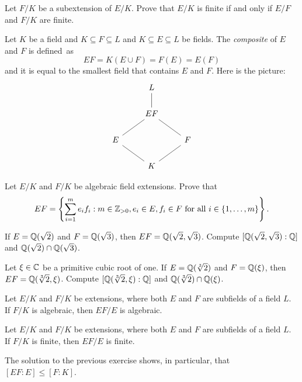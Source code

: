\begin{exercise}
\label{xca:tower of finite extensions}
	Let $F/K$ be a subextension of $E/K$. Prove that $E/K$ is finite 
	if and only if $E/F$ and $F/K$ are finite. 
\end{exercise}

Let $K$ be a field and $K\subseteq 
F\subseteq L$ and $K\subseteq E\subseteq L$ be fields. The \emph{composite}  
of $E$ and $F$ is defined~as 
\[
EF=K(E\cup F)=F(E)=E(F)
\]
and it is equal to the 
smallest field that contains $E$ and $F$. Here is the
picture:
\[\begin{tikzcd}
	& L \\
	& EF \\
	E && F \\
	& K
	\arrow[no head, from=1-2, to=2-2]
	\arrow[no head, from=2-2, to=3-1]
	\arrow[no head, from=2-2, to=3-3]
	\arrow[no head, from=3-1, to=4-2]
	\arrow[no head, from=4-2, to=3-3]
\end{tikzcd}\]


\begin{exercise}
\label{xca:composite generated by products}
    Let $E/K$ and $F/K$ be algebraic field extensions. 
    Prove that 
    \[
    EF=\left\{\sum_{i=1}^me_if_i:m\in\mathbb{Z}_{>0},e_i\in E,f_i\in F\text{ for all $i\in\{1,\dots,m\}$}\right\}.
    \]
\end{exercise}

\begin{exercise}
\label{xca:sqrt(2),sqrt(3)}
    If $E=\mathbb{Q}(\sqrt{2})$ and $F=\mathbb{Q}(\sqrt{3})$, then $EF=\mathbb{Q}(\sqrt{2},\sqrt{3})$. 
    Compute $[\mathbb{Q}(\sqrt{2},\sqrt{3}):\mathbb{Q}]$ and 
    $\mathbb{Q}(\sqrt{2})\cap\mathbb{Q}(\sqrt{3})$. 
\end{exercise}

\begin{exercise}
\label{xca:sqrt[3]2,3rd root of 1}
    Let $\xi\in\mathbb{C}$ be a primitive cubic root of one. 
    If $E=\mathbb{Q}(\sqrt[3]{2})$ and $F=\mathbb{Q}(\xi)$, then $EF=\mathbb{Q}(\sqrt[3]{2},\xi)$. 
    Compute $[\mathbb{Q}(\sqrt[3]{2},\xi):\mathbb{Q}]$ and 
    $\mathbb{Q}(\sqrt[3]{2})\cap\mathbb{Q}(\xi)$. 
\end{exercise}

\begin{exercise}
\label{xca: shift for algebraic}
	Let $E/K$ and $F/K$ be extensions, where both $E$ and $F$ are subfields of 
	a field $L$. If $F/K$ is algebraic, then $EF/E$ is algebraic.
\end{exercise}


\begin{exercise}
\label{xca: shift for finite}
	Let $E/K$ and $F/K$ be extensions, where both $E$ and $F$ are subfields of 
	a field $L$. If $F/K$ is finite, then $EF/E$ is finite.
\end{exercise}

The solution to the previous exercise shows, in particular, that $[EF:E]\leq [F:K]$. 
